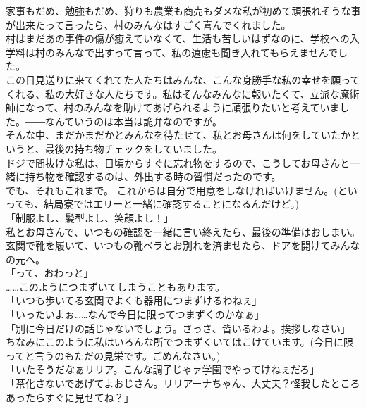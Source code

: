 \documentclass[oneside, a4paper]{jsbook}
\begin{document}
家事もだめ、勉強もだめ、狩りも農業も商売もダメな私が初めて頑張れそうな事が出来たって言ったら、村のみんなはすごく喜んでくれました。\\
村はまだあの事件の傷が癒えていなくて、生活も苦しいはずなのに、学校への入学料は村のみんなで出すって言って、私の遠慮も聞き入れてもらえませんでした。\\
この日見送りに来てくれてた人たちはみんな、こんな身勝手な私の幸せを願ってくれる、私の大好きな人たちです。私はそんなみんなに報いたくて、立派な魔術師になって、村のみんなを助けてあげられるように頑張りたいと考えていました。――なんていうのは本当は詭弁なのですが。\\

そんな中、まだかまだかとみんなを待たせて、私とお母さんは何をしていたかというと、最後の持ち物チェックをしていました。\\
ドジで間抜けな私は、日頃からすぐに忘れ物をするので、こうしてお母さんと一緒に持ち物を確認するのは、外出する時の習慣だったのです。\\
でも、それもこれまで。
これからは自分で用意をしなければいけません。(といっても、結局寮ではエリーと一緒に確認することになるんだけど。)\\

「制服よし、髪型よし、笑顔よし！」\\
私とお母さんで、いつもの確認を一緒に言い終えたら、最後の準備はおしまい。\\
玄関で靴を履いて、いつもの靴ベラとお別れを済ませたら、ドアを開けてみんなの元へ。\\

\noindent
「って、おわっと」\\

……このようにつまずいてしまうこともあります。\\

\noindent
「いつも歩いてる玄関でよくも器用につまずけるわねぇ」\\
「いったいよぉ……なんで今日に限ってつまずくのかなぁ」\\
「別に今日だけの話じゃないでしょう。さっさ、皆いるわよ。挨拶しなさい」\\

ちなみにこのように私はいろんな所でつまずくいてはこけています。(今日に限ってと言うのもただの見栄です。ごめんなさい。)\\

\noindent
「いたそうだなぁリリア。こんな調子じゃァ学園でやってけねぇだろ」\\
「茶化さないであげてよおじさん。リリアーナちゃん、大丈夫？怪我したところあったらすぐに見せてね？」\\
\end{document}

